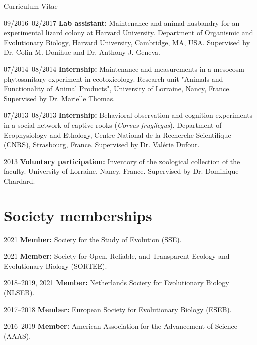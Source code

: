 \documentclass[11pt,a4paper]{article}
\begin{document}
\begin{cv}{Curriculum Vitae}
\begin{cvlist}{}
			\item[09/2016--02/2017] \textbf{Lab assistant:} Maintenance and animal husbandry for an experimental lizard colony at Harvard University. Department of Organismic and Evolutionary Biology, Harvard University, Cambridge, MA, USA. Supervised by Dr. Colin M. Donihue and Dr. Anthony J. Geneva.
		
			\item[07/2014--08/2014] \textbf{Internship:} Maintenance and measurements in a mesocosm phytosanitary experiment in ecotoxicology. Research unit "Animals and Functionality of Animal Products", University of Lorraine, Nancy, France. Supervised by Dr. Marielle Thomas.
		
			\item[07/2013--08/2013] \textbf{Internship:} Behavioral observation and cognition experiments in a social network of captive rooks (\textit{Corvus frugilegus}). Department of Ecophysiology and Ethology, Centre National de la Recherche Scientifique (CNRS), Strasbourg, France. Supervised by Dr. Valérie Dufour.
		
			\item[2013] \textbf{Voluntary participation:} Inventory of the zoological collection of the faculty. University of Lorraine, Nancy, France. Supervised by Dr. Dominique Chardard.
		
		\end{cvlist}
		
		\section{Society memberships}
		
		\begin{cvlist}{}
			
			\item[2021] \textbf{Member:} Society for the Study of Evolution (SSE). 
			
			\item[2021] \textbf{Member:} Society for Open, Reliable, and Transparent Ecology and Evolutionary Biology (SORTEE).
			
			\item[2018--2019, 2021] \textbf{Member:} Netherlands Society for Evolutionary Biology (NLSEB).
			
			\item[2017--2018] \textbf{Member:} European Society for Evolutionary Biology (ESEB).
			
			\item[2016--2019] \textbf{Member:} American Association for the Advancement of Science (AAAS).
			

\end{cvlist}
\end{cv}
\end{document}
